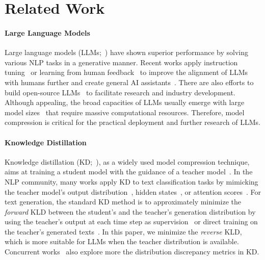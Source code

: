 \documentclass{article}
\begin{document}
\section{Related Work}

\paragraph{Large Language Models} Large language models (LLMs;~\citealp{gpt3,lamda,palm,gpt4,palm2}) have shown superior performance by solving various NLP tasks in a generative manner. Recent works apply instruction tuning~\citep{flan,t0,flan-t5} or learning from human feedback~\citep{instruct-gpt,hhh} to improve the alignment of LLMs with humans further and create general AI assistants~\citep{chatgpt,bard}. There are also efforts to build open-source LLMs~\citep{opt,llama,pythia} to facilitate research and industry development. Although appealing, the broad capacities of LLMs usually emerge with large model sizes~\citep{scaling_law,emergent} that require massive computational resources. Therefore, model compression is critical for the practical deployment and further research of LLMs.

\paragraph{Knowledge Distillation} Knowledge distillation (KD;~\citealp{kd}), as a widely used model compression technique, aims at training a student model with the guidance of a teacher model~\citep{policy_kd,distilbert,kdsurvey}. In the NLP community, many works apply KD to text classification tasks by mimicking the teacher model's output distribution~\citep{lightpaff,mixkd,perturb_kd}, hidden states~\citep{tinybert,bert-pkd}, or attention scores~\citep{minilm,minilmv2}. For text generation, the standard KD method is to approximately minimize the \textit{forward} KLD between the student's and the teacher's generation distribution by using the teacher's output at each time step as supervision~\citep{distilbert} or direct training on the teacher's generated texts~\citep{skd,alpaca,vicuna,ITGPT4}. In this paper, we minimize the \textit{reverse} KLD, which is more suitable for LLMs when the teacher distribution is available. Concurrent works~\citep{gkd,f-div-kd} also explore more the distribution discrepancy metrics in KD.
\end{document}
